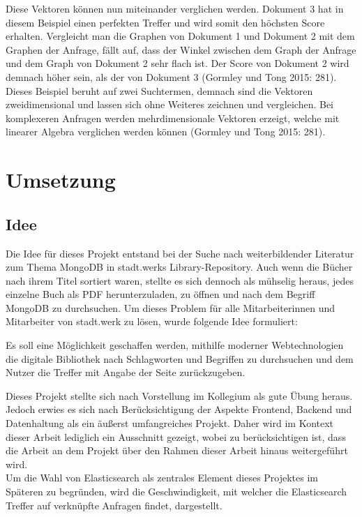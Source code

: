 \documentclass[a4paper]{scrartcl}
\begin{document}
Diese Vektoren können nun miteinander verglichen werden. Dokument 3 hat in diesem Beispiel einen perfekten Treffer und wird somit den höchsten Score erhalten. Vergleicht man die Graphen von Dokument 1 und Dokument 2 mit dem Graphen der Anfrage, fällt auf, dass der Winkel zwischen dem Graph der Anfrage und dem Graph von Dokument 2 sehr flach ist. Der Score von Dokument 2 wird demnach höher sein, als der von Dokument 3 (Gormley und Tong 2015: 281). \\
Dieses Beispiel beruht auf zwei Suchtermen, demnach sind die Vektoren zweidimensional und lassen sich ohne Weiteres zeichnen und vergleichen. Bei komplexeren Anfragen werden mehrdimensionale Vektoren erzeigt, welche mit linearer Algebra verglichen werden können (Gormley und Tong 2015: 281).

\section{Umsetzung}

\subsection{Idee}
Die Idee für dieses Projekt entstand bei der Suche nach weiterbildender Literatur zum Thema MongoDB in stadt.werks Library-Repository. Auch wenn die Bücher nach ihrem Titel sortiert waren, stellte es sich dennoch als mühselig heraus, jedes einzelne Buch als PDF herunterzuladen, zu öffnen und nach dem Begriff MongoDB zu durchsuchen. Um dieses Problem für alle Mitarbeiterinnen und Mitarbeiter von stadt.werk zu lösen, wurde folgende Idee formuliert:

\begin{center}
	Es soll eine Möglichkeit geschaffen werden, mithilfe moderner Webtechnologien die digitale Bibliothek nach Schlagworten und Begriffen zu durchsuchen und dem Nutzer die Treffer mit Angabe der Seite zurückzugeben.
\end{center}

Dieses Projekt stellte sich nach Vorstellung im Kollegium als gute Übung heraus. Jedoch erwies es sich nach Berücksichtigung der Aspekte Frontend, Backend und Datenhaltung als ein äußerst umfangreiches Projekt. Daher wird im Kontext dieser Arbeit lediglich ein Ausschnitt gezeigt, wobei zu berücksichtigen ist, dass die Arbeit an dem Projekt über den Rahmen dieser Arbeit hinaus weitergeführt wird. \\
Um die Wahl von Elasticsearch als zentrales Element dieses Projektes im Späteren zu begründen, wird die Geschwindigkeit, mit welcher die Elasticsearch Treffer auf verknüpfte Anfragen findet, dargestellt.
\end{document}

